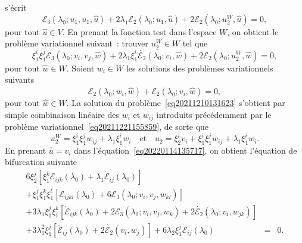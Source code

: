 \documentclass[12pt, final]{amsart}
\begin{document}
s'{\'e}crit
\begin{equation}
  \mathcal{E}_3 (\lambda_0 ; u_1, u_1, \hat{u}) + 2 \lambda_1
  \dot{\mathcal{E}_2} (\lambda_0 ; u_1, \hat{u}) + 2\mathcal{E}_2 (\lambda_0 ;
  u_2^W, \hat{u}) = 0,
\end{equation}
pour tout $\hat{u} \in V$. En prenant la fonction test dans l'espace $W$, on
obtient le probl{\`e}me variationnel suivant~: trouver $u_2^W \in W$ tel que
\begin{equation}
  \label{eq20211210131623} \xi_1^i \xi_1^j \mathcal{E}_3 (\lambda_0 ; v_i,
  v_j, \hat{w}) + 2 \lambda_1 \xi_1^i  \dot{\mathcal{E}_2} (\lambda_0 ; v_i,
  \hat{w}) + 2\mathcal{E}_2 (\lambda_0 ; u_2^W, \hat{w}) = 0,
\end{equation}
pour tout $\hat{w} \in W$. Soient $w_i \in W$ les solutions des probl{\`e}mes
variationnels suivants
\begin{equation}
  \label{eq20220208143055} \mathcal{E}_2 (\lambda_0 ; w_i, \hat{w}) +
  \dot{\mathcal{E}_2} (\lambda_0 ; v_i, \hat{w}) = 0,
\end{equation}
pour tout $\hat{w} \in W$. La solution du
probl{\`e}me~\eqref{eq20211210131623} s'obtient par simple combinaison
lin{\'e}aire des $w_i$ et $w_{ij}$ introduits pr{\'e}c{\'e}demment par le
probl{\`e}me variationnel~\eqref{eq20211221155859}, de sorte que
\begin{equation}
  \label{eq20220124135324} u_2^W = \xi_1^i \xi_1^j w_{i  j} +
  \lambda_1 \xi_1^i w_i \quad \text{et} \quad u_2 = \xi_2^i v_i + \xi_1^i
  \xi_1^j w_{i  j} + \lambda_1 \xi_1^i w_i .
\end{equation}
En prenant $\hat{u} = v_i$ dans l'{\'e}quation~\eqref{eq20220114135717}, on
obtient l'{\'e}quation de bifurcation suivante
\begin{eqnarray}
  6 \xi_2^j  [\xi_1^k \mathcal{E}_{i  j  k} (\lambda_0) +
  \lambda_1  \dot{\mathcal{E}}_{i  j} (\lambda_0)] &  &  \nonumber\\
  + \xi_1^j \xi_1^k \xi_1^l  [\mathcal{E}_{i  j  k  l}
  (\lambda_0) + 6\mathcal{E}_3 (\lambda_0 ; v_i, v_j, w_{k  l})] &  &
  \nonumber\\
  + 3 \lambda_1 \xi_1^j \xi_1^k  [\dot{\mathcal{E}}_{i  j  k}
  (\lambda_0) + 2\mathcal{E}_3 (\lambda_0 ; v_i, v_j, w_k) + 2
  \dot{\mathcal{E}_2} (\lambda_0 ; v_i, w_{j  k})] &  &  \nonumber\\
  + 3 \lambda_1^2 \xi_1^j  [\ddot{\mathcal{E}}_{i  j} (\lambda_0) + 2
  \dot{\mathcal{E}_2} (v_i, w_j)] + 6 \lambda_2 \xi_1^j  \dot{\mathcal{E}}_{i
   j} (\lambda_0) & = & 0.  \label{eq20220210143805}
\end{eqnarray}
\end{document}
